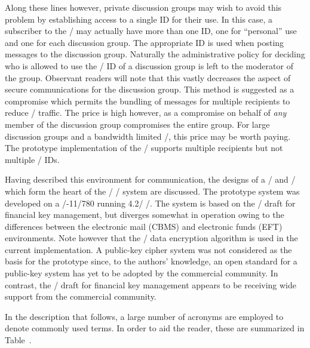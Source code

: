 Along these lines however,
private discussion groups may wish to avoid this problem by establishing
access to a single ID for their use.
In this case,
a subscriber to the \KDS/ may actually have more than one ID,
one for ``personal'' use and one for each discussion group.
The appropriate ID is used when posting messages to the discussion group.
Naturally the administrative policy for deciding who is allowed to use the
\KDS/ ID of a discussion group is left to the moderator of the group.
Observant readers will note that this vastly decreases the aspect of
secure communications for the discussion group.
This method is suggested as a compromise
which permits the bundling of messages for multiple recipients
to reduce \MTS/ traffic.
The price is high however,
as a compromise on behalf of {\it any} member of the discussion group
compromises the entire group.
For large discussion groups and a bandwidth limited \MTS/,
this price may be worth paying.
The prototype implementation of the \TMA/ supports multiple recipients but
not multiple \KDS/ IDs.

Having described this environment for communication,
the designs of a \KDS/ and \TMA/ which form the heart of the \TTI/
\trustedmail/ system are discussed.
The prototype system was developed on a \vax/-11/780 running 4.2\bsd/ \unix/.
The system is based on the \ansi/ draft\cite{FIKM}
for financial key management,
but diverges somewhat in operation
owing to the differences between the electronic mail (CBMS)
and electronic funds (EFT) environments.
Note however that the \ansi/ data encryption algorithm\cite{DEA,FIPS46} is
used in the current implementation.
A public-key cipher system was not considered as the basis for the prototype
since, to the authors' knowledge,
an open standard for a public-key system has yet to be adopted by the
commercial community.
In contrast,
the \ansi/ draft for financial key management appears to be receiving
wide support from the commercial community.

In the description that follows,
a large number of acronyms are employed to denote commonly used terms.
In order to aid the reader,
these are summarized in Table~\terms.

